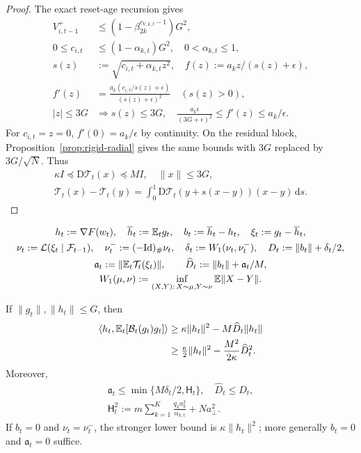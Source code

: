 \begin{proof}
The exact reset-age recursion gives
\begin{align}
 V_{i,t-1}^+&\le(1-\beta_{2k}^{c_{V,k,t}-1})G^2,\\
 0\le c_{i,t}&\le(1-\alpha_{k,t})G^2,\quad0<\alpha_{k,t}\le1,\\
 s(z)&:=\sqrt{c_{i,t}+\alpha_{k,t}z^2},\quad
 f(z):=a_kz/(s(z)+\epsilon),\\
 f'(z)&=\frac{a_k(c_{i,t}/s(z)+\epsilon)}{(s(z)+\epsilon)^2}
 \quad(s(z)>0),\\
 |z|\le3G&\Longrightarrow s(z)\le3G,\quad
 \frac{a_k\epsilon}{(3G+\epsilon)^2}\le f'(z)\le a_k/\epsilon.
\end{align}
For $c_{i,t}=z=0$, $f'(0)=a_k/\epsilon$ by continuity. On the residual block,
Proposition~\ref{prop:rigid-radial} gives the same bounds with
$3G$ replaced by $3G/\sqrt N$. Thus
\begin{gather}
 \kappa I\preceq\mathrm D\mathcal T_t(x)\preceq MI,\quad\|x\|\le3G,\\
 \mathcal T_t(x)-\mathcal T_t(y)
 =\int_0^1\mathrm D\mathcal T_t(y+s(x-y))(x-y)\,\mathrm ds.
\end{gather}
\end{proof}
\begin{definition}\label{def:actual-symmetry}
\begin{gather}
 h_t:=\nabla F(w_t),\quad\overline h_t:=\mathbb E_tg_t,\quad
 b_t:=\overline h_t-h_t,\quad\xi_t:=g_t-\overline h_t,\\
 \nu_t:=\mathcal L(\xi_t\mid\mathcal F_{t-1}),\quad
 \nu_t^-:=(-\mathrm{Id})_\#\nu_t,\quad
 \delta_t:=W_1(\nu_t,\nu_t^-),\quad D_t:=\|b_t\|+\delta_t/2,\\
 \mathfrak a_t:=\|\mathbb E_t\mathcal T_t(\xi_t)\|,\qquad
 \widehat D_t:=\|b_t\|+\mathfrak a_t/M,\\
 W_1(\mu,\nu):=\inf_{(X,Y):\,X\sim\mu,Y\sim\nu}\mathbb E\|X-Y\|.
\end{gather}
\end{definition}
\begin{theorem}
\label{thm:actual-coercivity}
If $\|g_t\|,\|h_t\|\le G$, then
\begin{align}
 \langle h_t,\mathbb E_t[\mathcal B_t(g_t)g_t]\rangle
 &\ge\kappa\|h_t\|^2-M\widehat D_t\|h_t\|\\
 &\ge\tfrac\kappa2\|h_t\|^2-\frac{M^2}{2\kappa}\widehat D_t^2.
\end{align}
Moreover,
\begin{gather}
 \mathfrak a_t\le\min\{M\delta_t/2,\mathsf H_t\},\quad
 \widehat D_t\le D_t,\\
 \mathsf H_t^2:=m\sum_{k=1}^K\frac{q_ka_k^2}{\alpha_{k,t}}+Na_\perp^2.
\end{gather}
If $b_t=0$ and $\nu_t=\nu_t^-$, the stronger lower bound is
$\kappa\|h_t\|^2$; more generally $b_t=0$ and $\mathfrak a_t=0$ suffice.
\end{theorem}
